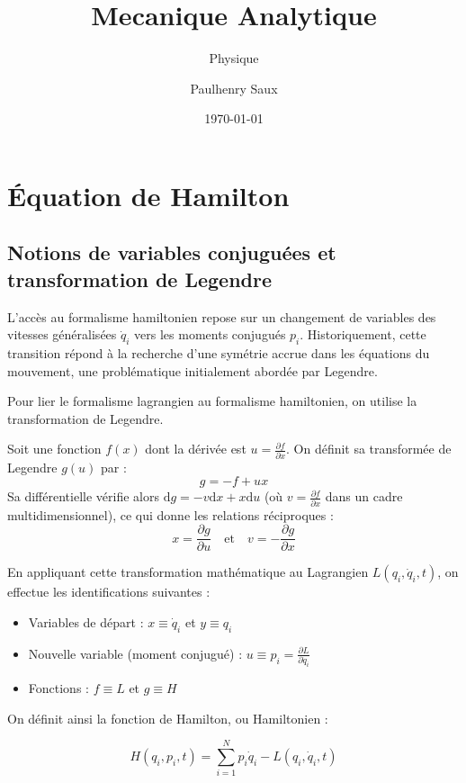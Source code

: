 \documentclass[french]{yLectureNote}
\title{Mecanique Analytique}
\subtitle{Physique}
\author{Paulhenry Saux}
\date{\today}
\newcommand{\dd}{\mathrm{d}}
\begin{document}
\chapter{Équation de Hamilton}

\section{Notions de variables conjuguées et transformation de Legendre}

L'accès au formalisme hamiltonien repose sur un changement de variables des vitesses généralisées $\dot{q}_i$ vers les moments conjugués $p_i$. Historiquement, cette transition répond à la recherche d'une symétrie accrue dans les équations du mouvement, une problématique initialement abordée par Legendre.

Pour lier le formalisme lagrangien au formalisme hamiltonien, on utilise la transformation de Legendre.

\begin{definition}
Soit une fonction $f(x)$ dont la dérivée est $u = \frac{\partial f}{\partial x}$. On définit sa transformée de Legendre $g(u)$ par :
\begin{equation}
    g = -f + ux
\end{equation}
Sa différentielle vérifie alors $\dd g = -v\dd x + x\dd u$ (où $v = \frac{\partial f}{\partial x}$ dans un cadre multidimensionnel), ce qui donne les relations réciproques :
\begin{equation}
    x = \frac{\partial g}{\partial u} \quad \text{et} \quad v = -\frac{\partial g}{\partial x}
\end{equation}
\end{definition}

En appliquant cette transformation mathématique au Lagrangien $L(q_i, \dot{q}_i, t)$, on effectue les identifications suivantes :
\begin{itemize}
    \item Variables de départ : $x \equiv \dot{q}_i$ et $y \equiv q_i$
    \item Nouvelle variable (moment conjugué) : $u \equiv p_i = \frac{\partial L}{\partial \dot{q}_i}$
    \item Fonctions : $f \equiv L$ et $g \equiv H$
\end{itemize}

On définit ainsi la fonction de Hamilton, ou Hamiltonien :
\begin{definition}[Hamiltonien]
\begin{equation}
    H(q_i, p_i, t) = \sum_{i=1}^N p_i \dot{q}_i - L(q_i, \dot{q}_i, t)
\end{equation}
\end{definition}
\end{document}
